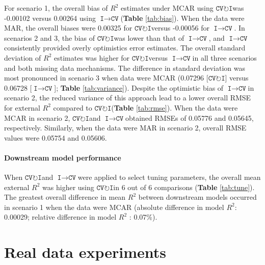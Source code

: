 \documentclass[AMA,STIX1COL,doublespace]{WileyNJD-v2}
\begin{document}
For scenario 1, the overall bias of \(R^2\) estimates under MCAR using
$\texttt{CV}\!\circlearrowright\!\texttt{I}$\space was -0.00102 versus
0.00264 using
$\texttt{I}\!\!\rightarrow\!\texttt{CV}$\space (\textbf{Table}
\ref{tab:bias}). When the data were MAR, the overall biases were 0.00325
for $\texttt{CV}\!\circlearrowright\!\texttt{I}$\space versus -0.00056
for $\texttt{I}\!\!\rightarrow\!\texttt{CV}$\space. In scenarios 2 and
3, the bias of $\texttt{CV}\!\circlearrowright\!\texttt{I}$\space was
lower than that of $\texttt{I}\!\!\rightarrow\!\texttt{CV}$\space, and
$\texttt{I}\!\!\rightarrow\!\texttt{CV}$\space consistently provided
overly optimistics error estimates. The overall standard deviation of
\(R^2\) estimates was higher for
$\texttt{CV}\!\circlearrowright\!\texttt{I}$\space versus
$\texttt{I}\!\!\rightarrow\!\texttt{CV}$\space in all three scenarios
and both missing data mechanisms. The difference in standard deviation
was most pronounced in scenario 3 when data were MCAR (0.07296
{[}$\texttt{CV}\!\circlearrowright\!\texttt{I}${]} versus 0.06728
{[}$\texttt{I}\!\!\rightarrow\!\texttt{CV}${]}; \textbf{Table}
\ref{tab:variance}). Despite the optimistic bias of
$\texttt{I}\!\!\rightarrow\!\texttt{CV}$\space in scenario 2, the
reduced variance of this approach lead to a lower overall RMSE for
external \(R^2\) compared to
$\texttt{CV}\!\circlearrowright\!\texttt{I}$\space (\textbf{Table}
\ref{tab:rmse}). When the data were MCAR in scenario 2,
$\texttt{CV}\!\circlearrowright\!\texttt{I}$\space and
$\texttt{I}\!\!\rightarrow\!\texttt{CV}$\space obtained RMSEs of 0.05776
and 0.05645, respectively. Similarly, when the data were MAR in scenario
2, overall RMSE values were 0.05754 and 0.05606.

\paragraph{Downstream model performance}

When $\texttt{CV}\!\circlearrowright\!\texttt{I}$\space and
$\texttt{I}\!\!\rightarrow\!\texttt{CV}$\space were applied to select
tuning parameters, the overall mean external \(R^2\) was higher using
$\texttt{CV}\!\circlearrowright\!\texttt{I}$\space in 6 out of 6
comparisons (\textbf{Table} \ref{tab:tune}). The greatest overall
difference in mean \(R^2\) between downstream models occurred in
scenario 1 when the data were MCAR (absolute difference in model
\(R^2\): 0.00029; relative difference in model \(R^2\) : 0.07\%).

\section{Real data experiments} \label{sec:app}
\end{document}
